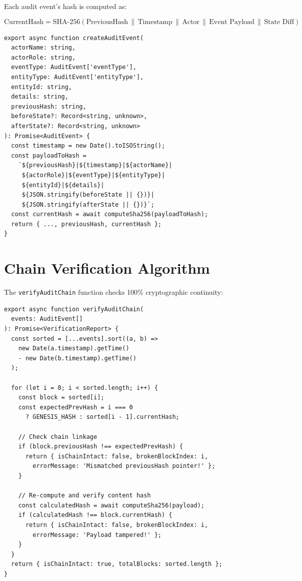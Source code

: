 \documentclass[12pt, a4paper]{report}
\begin{document}
Each audit event's hash is computed as:

$$\text{CurrentHash} = \text{SHA-256}\left(\text{PreviousHash} \,\|\, \text{Timestamp} \,\|\, \text{Actor} \,\|\, \text{Event Payload} \,\|\, \text{State Diff}\right)$$

\begin{lstlisting}[caption={Audit Event Creation with Hash Chaining (auditService.ts)}, label={lst:audit-create}]
export async function createAuditEvent(
  actorName: string,
  actorRole: string,
  eventType: AuditEvent['eventType'],
  entityType: AuditEvent['entityType'],
  entityId: string,
  details: string,
  previousHash: string,
  beforeState?: Record<string, unknown>,
  afterState?: Record<string, unknown>
): Promise<AuditEvent> {
  const timestamp = new Date().toISOString();
  const payloadToHash =
    `${previousHash}|${timestamp}|${actorName}|
     ${actorRole}|${eventType}|${entityType}|
     ${entityId}|${details}|
     ${JSON.stringify(beforeState || {})}|
     ${JSON.stringify(afterState || {})}`;
  const currentHash = await computeSha256(payloadToHash);
  return { ..., previousHash, currentHash };
}
\end{lstlisting}

\section{Chain Verification Algorithm}

The \texttt{verifyAuditChain} function checks 100\% cryptographic continuity:

\begin{lstlisting}[caption={Audit Chain Verification (auditService.ts, lines 137--192)}, label={lst:audit-verify}]
export async function verifyAuditChain(
  events: AuditEvent[]
): Promise<VerificationReport> {
  const sorted = [...events].sort((a, b) =>
    new Date(a.timestamp).getTime()
    - new Date(b.timestamp).getTime()
  );

  for (let i = 0; i < sorted.length; i++) {
    const block = sorted[i];
    const expectedPrevHash = i === 0
      ? GENESIS_HASH : sorted[i - 1].currentHash;

    // Check chain linkage
    if (block.previousHash !== expectedPrevHash) {
      return { isChainIntact: false, brokenBlockIndex: i,
        errorMessage: 'Mismatched previousHash pointer!' };
    }

    // Re-compute and verify content hash
    const calculatedHash = await computeSha256(payload);
    if (calculatedHash !== block.currentHash) {
      return { isChainIntact: false, brokenBlockIndex: i,
        errorMessage: 'Payload tampered!' };
    }
  }
  return { isChainIntact: true, totalBlocks: sorted.length };
}
\end{lstlisting}
\end{document}
